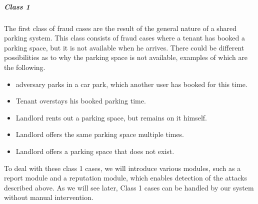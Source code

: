 \subparagraph{Class 1} The first class of fraud cases are the result of the general nature of a shared parking system. This class consists of fraud cases where a tenant has booked a parking space, but it is not available when he arrives. There could be different possibilities as to why the parking space is not available, examples of which are the following.
\begin{itemize}
\item adversary parks in a car park, which another user has booked for this time.
\item Tenant overstays his booked parking time.
\item Landlord rents out a parking space, but remains on it himself.
\item Landlord offers the same parking space multiple times.
\item Landlord offers a parking space that does not exist.
\end{itemize}
To deal with these class 1 cases, we will introduce various modules, such as a report module and a reputation module, which enables detection of the attacks described above. As we will see later, Class 1 cases can be handled by our system without manual intervention. 


